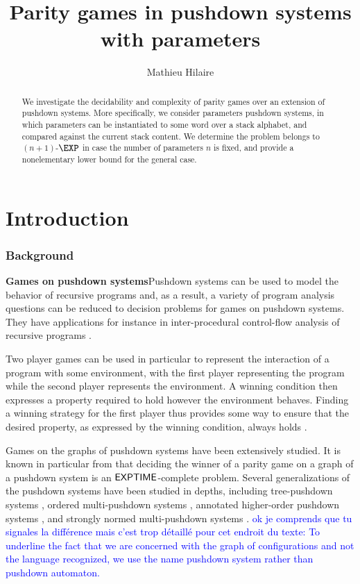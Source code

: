 \documentclass[a4paper,UKenglish,cleveref, autoref, thm-restate]{lipics-v2021}
\title{Parity games in pushdown systems with parameters}
\author{Mathieu Hilaire}{Université Paris-Saclay\and
CNRS\and
ENS Paris-Saclay\and
Laboratoire Méthodes Formelles (LMF)\and
Gif-sur-Yvette, France
}{hilaire@lsv.fr}{}{This work was partly done while the author was supported by the 
Agence Nationale de la Recherche grant no.  ANR-17-CE40-0010.}
\begin{document}
\maketitle


\begin{abstract}
	We investigate the decidability and complexity of
	parity games over an extension of pushdown systems.
	More specifically, we consider parameters pushdown systems, in
	which parameters can be instantiated to some word over a stack alphabet,
	and compared against the current stack content.
	We determine the problem
	belongs to $(n+1)$-$\EXP$ in case the number of parameters
$n$ is fixed, and provide a nonelementary lower bound for the general case. 
\end{abstract}

\section{Introduction}

\subsubsection*{Background}




{\bf Games on pushdown systems}Pushdown systems can be used to model the behavior of recursive programs and,
as a result, a variety of 
 program analysis questions can be reduced to decision problems for games on pushdown systems.
They have applications for instance in inter-procedural control-flow analysis of recursive programs \cite{esparza1999automata, reps2005weighted}.





Two player games can be used in particular to
 represent the
interaction of a program with some environment, with the first player representing the program while the second player represents the environment. A winning condition then expresses a property required to hold however the environment behaves. Finding a winning strategy for the first player
thus provides some way 
 to ensure that the desired 
property, as expressed by the winning condition,
always holds \cite{arnold2003games}.


Games on the graphs of pushdown systems have been extensively studied.
It is known in particular from \cite{walukiewicz1996pushdown} that deciding the winner of a parity game on a graph of a pushdown system is an ${\sf EXPTIME}$-complete problem.
Several generalizations of the pushdown systems 
have been studied in depths, including
tree-pushdown systems \cite{guessarian1983pushdown}, ordered
multi-pushdown systems \cite{breveglieri1996multi, atig2012model}, annotated higher-order pushdown systems \cite{maslov1976multilevel, broadbent2012saturation}, and
strongly normed multi-pushdown systems \cite{czerwinski2012reachability}.
\textcolor{blue}{ok je comprends que tu signales la différence mais c'est trop détaillé pour cet endroit du texte: To underline the fact that we are concerned with the graph of configurations and not the language recognized, we use the name pushdown system rather than pushdown automaton.}
\end{document}
